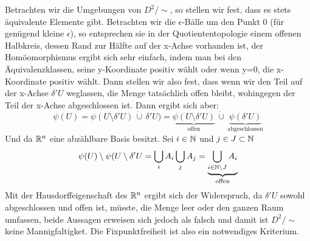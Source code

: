 \documentclass{scrartcl}
\begin{document}
\begin{aufgabe}
\begin{enumerate}[(i)]

Betrachten wir die Umgebungen von $ D^2/\sim $, so stellen wir fest, dass es stets äquivalente Elemente gibt. Betrachten wir die $ \epsilon $-Bälle um den Punkt 0 (für genügend kleine $ \epsilon $), so entsprechen sie in der Quotiententopologie einem offenen Halbkreis, dessen Rand zur Hälfte auf der x-Achse vorhanden ist,  der Homöomorphismus ergibt sich sehr einfach, indem man bei den Äquivalenzklassen, seine y-Koordinate positiv wählt oder wenn y=0, die x-Koordinate positiv wählt.  Dann stellen wir also fest, dass wenn wir den Teil auf der x-Achse $ \delta' U $ weglassen, die Menge tatsächlich offen bleibt, wohingegen der Teil  der x-Achse abgeschlossen ist. Dann ergibt sich aber:
\[
\psi(U)=\psi(U\setminus \delta' U)\,\dot\cup\, \delta' U)=\underbrace{\psi(U\setminus \delta' U)}_{\text{offen}} \,\dot\cup\, \underbrace{\psi(\delta' U)}_{\text{abgeschlossen}}
\]   
Und da $ \mathbb{R}^n $ eine abzählbare Basis besitzt. Sei $ i\in \mathbb{N} $ und $ j\in J \subset \mathbb{N} $
\[
\psi(U)\setminus \psi(U\setminus \delta' U = \bigcup_i A_i \bigcup_{j} A_{j}=\underbrace{\bigcup_{i\in\mathbb{N}\setminus J} A_i}_{\text{offen}} 
\]
 Mit der Hausdorffeigenschaft des $ \mathbb{R}^n $ ergibt sich der Widerspruch, da  $ \delta' U $ sowohl abgeschlossen und offen ist, müsste, die Menge leer oder den ganzen Raum umfassen, beide Aussagen erweisen sich jedoch als falsch und damit ist $ D^2/\sim $ keine Mannigfaltigket.  Die Fixpunktfreiheit ist also ein notwendiges Kriterium. 
\end{enumerate}
\end{aufgabe}
\end{document}
